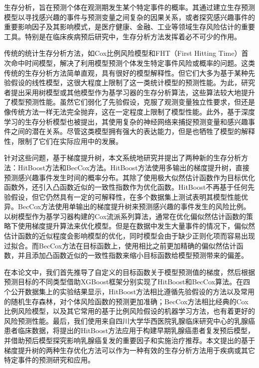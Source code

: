 	
\begin{chineseabstract}
    生存分析，旨在预测个体在观测期发生某个特定事件的概率。其通过建立生存预测模型以寻找感兴趣的事件与预测变量之间复杂的因果关系，或者探究感兴趣事件的重要影响因子及其影响模式，是医疗健康、金融、工业等领域生存风险估计的重要工具。特别是在临床疾病预后研究中，生存分析方法发挥着必不可少的作用。

    传统的统计生存分析方法，如Cox比例风险模型和FHT（First Hitting Time）首次命中时间模型，解决了利用模型预测个体发生特定事件风险或概率的问题。这类传统的生存分析方法简单直观，具有很好的模型解释性。但它们大多为基于某种先验假设的线性模型，这很大程度上限制了这一类统计模型的预测性能。为此，研究者提出采用树模型或其他模型作为基学习器的生存分析算法，这些算法较大地提升了模型预测性能。虽然它们弱化了先验假设，克服了观测变量独立性要求，但还是像传统方法一样无法完全抛弃，这在一定程度上限制了模型性能。此外，基于深度学习的生存分析模型也被提出，其使用复杂的神经网络来捕捉预测变量和感兴趣事件之间的潜在关系。尽管这类模型拥有强大的表达能力，但是也牺牲了模型的解释性，限制了它们在实际应用中的发展。

    针对这些问题，基于梯度提升树，本文系统地研究并提出了两种新的生存分析方法：HitBoost方法和BecCox方法。HitBoost方法使用多输出的梯度提升树，直接预测感兴趣事件发生时间的概率分布。其除了使用极大似然估计函数作为目标优化函数外，还引入凸函数近似的一致性指数作为优化函数。HitBoost不再基于任何先验假设，但它仍然具有一定的可解释性，在多个数据集上测试表明其模型性能优异。BecCox方法使用单输出的梯度提升树来预测感兴趣的事件发生的风险比例。以树模型作为基学习器构建的Cox流派系列算法，通常在优化偏似然估计函数的策略下使用梯度提升算法来优化模型。但是在数据中发生大量事件的情况下，偏似然估计函数的近似程度会影响模型的优化，同时模型会由于缺少正则化项而容易出现过拟合。而BecCox方法在目标函数上，使用相比之前更加精确的偏似然估计函数，并且添加凸函数近似的一致性指数来缩小目标函数给模型预测带来的偏差。

    在本论文中，我们首先推导了自定义的目标函数关于模型预测值的梯度，然后根据预测目标的不同类型借助XGBoost框架分别实现了HitBoost和BecCox算法。在四个公开数据集上的实验结果显示，HitBoost方法相比遵循先验假设的方法以及常用的随机生存森林，对个体风险函数的预测更加准确；BecCox方法相比经典的Cox比例风险模型，以及其它常用的基于比例风险假设的机器学习方法，也有着更好的风险预测性能。最后，我们使用来自四川大学华西医院乳腺临床研究中心的乳腺癌患者临床数据，将提出的HitBoost方法应用于构建早期乳腺癌患者复发预后模型，并借助预后模型探究影响乳腺癌复发的重要因子和实施治疗推荐。本文提出的基于梯度提升树的两种生存优化方法可以作为一种有效的生存分析方法用于疾病或其它特定事件的预测研究和应用。


\end{chineseabstract}

